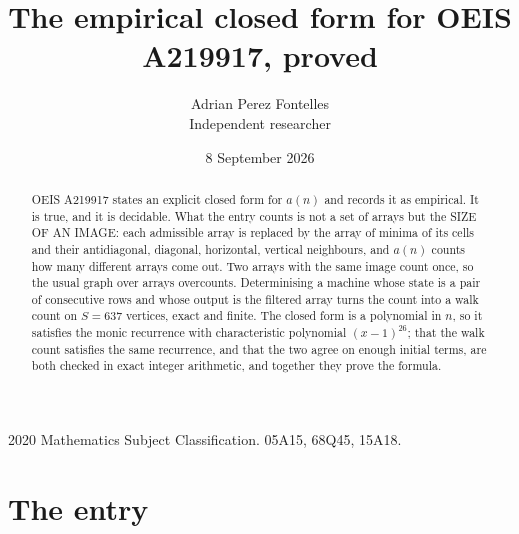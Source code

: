 \documentclass[11pt,a4paper]{article}
\title{The empirical closed form for OEIS A219917, proved}
\author{Adrian Perez Fontelles\\ \small Independent researcher}
\date{8 September 2026}
\theoremstyle{plain}
\theoremstyle{definition}
\begin{document}
\maketitle

\begin{abstract}
OEIS A219917 states an explicit closed form for $a(n)$ and records it as empirical. It is true, and
it is decidable. What the entry counts is not a set of arrays but the SIZE OF AN IMAGE: each
admissible array is replaced by the array of minima of its cells and their antidiagonal, diagonal, horizontal, vertical neighbours,
and $a(n)$ counts how many different arrays come out. Two arrays with the same image count
once, so the usual graph over arrays overcounts. Determinising a machine whose state is a pair
of consecutive rows and whose output is the filtered array turns the count into a walk count on
$S=637$ vertices, exact and finite. The closed form is a polynomial in $n$, so it satisfies the
monic recurrence with characteristic polynomial $(x-1)^{26}$; that the walk count
satisfies the same recurrence, and that the two agree on enough initial terms, are both checked
in exact integer arithmetic, and together they prove the formula.
\end{abstract}

\noindent\small 2020 Mathematics Subject Classification. 05A15, 68Q45, 15A18.\normalsize

\section{The entry}
\end{document}
